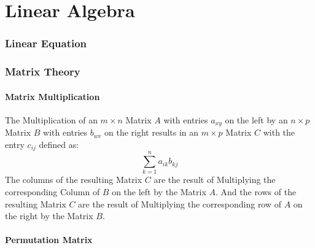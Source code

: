 \part{Linear Algebra}\label{sec:linear_algebra}

\section{Linear Equation}\label{sec:linear_equation}

\section{Matrix Theory}\label{sec:matrix_theory}

\subsection{Matrix Multiplication}\label{sec:matrix_multiplication}

The Multiplication of an $m \times n$ Matrix $A$ with entries $a_{xy}$
on the left by an $n \times p$ Matrix $B$ with entries $b_{wv}$ on the
right results in an $m \times p$ Matrix $C$ with the entry $c_{ij}$
defined as:
\[
  \sum_{k=1}^n a_{ik} b_{kj}
\]
The columns of the resulting Matrix $C$ are the result of Multiplying
the corresponding Column of $B$ on the left by the Matrix $A$. And the
rows of the resulting Matrix $C$ are the result of Multiplying the
corresponding row of $A$ on the right by the Matrix $B$.



\subsection{Permutation Matrix}\label{sec:permutation_matrix}

